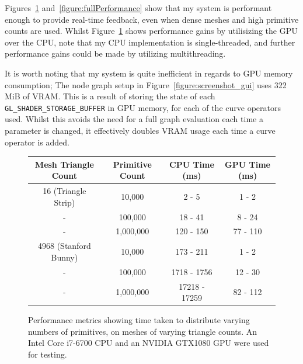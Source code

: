 \documentclass[]{acmsiggraph}
\begin{document}
Figures~\ref{figure:distributionPerformance} and~\ref{figure:fullPerformance} show that my system is performant enough to provide real-time feedback, even when dense meshes and high primitive counts are used. Whilst Figure~\ref{figure:distributionPerformance} shows performance gains by utilisizing the GPU over the CPU, note that my CPU implementation is single-threaded, and further performance gains could be made by utilizing multithreading.

It is worth noting that my system is quite inefficient in regards to GPU memory consumption; The node graph setup in Figure~\ref{figure:screenshot_gui} uses 322 MiB of VRAM. This is a result of storing the state of each \texttt{GL\_SHADER\_STORAGE\_BUFFER} in GPU memory, for each of the curve operators used. Whilst this avoids the need for a full graph evaluation each time a parameter is changed, it effectively doubles VRAM usage each time a curve operator is added.

\begin{figure}[htbp]\centering
\begin{center}
\begin{tabular}{||c||c|c|c||}
\hline
Mesh Triangle Count & Primitive Count & CPU Time (ms) & GPU Time (ms)\\
\hline
\hline
16 (Triangle Strip) & 10,000 & 2 - 5 & 1 - 2\\
\hline
 - & 100,000 & 18 - 41 & 8 - 24\\
\hline
 - & 1,000,000 & 120 - 150 & 77 - 110\\
\hline
4968 (Stanford Bunny) & 10,000 & 173 - 211 & 1 - 2\\
\hline
 - & 100,000 & 1718 - 1756 & 12 - 30\\
\hline
 - & 1,000,000 & 17218 - 17259 & 82 - 112\\
\hline
\end{tabular}
\caption{\label{figure:distributionPerformance} Performance metrics showing time taken to distribute varying numbers of primitives, on meshes of varying triangle counts. An Intel Core i7-6700 CPU and an NVIDIA GTX1080 GPU were used for testing.}
\end{center}
\end{figure}

\end{document}
